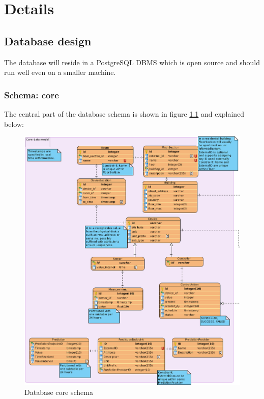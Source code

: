 
\chapter{Details}\label{ch:details}


\section{Database design}
The database will reside in a PostgreSQL DBMS which is open source and should run well even on a smaller machine.

\subsection{Schema: core}
The central part of the database schema is shown in figure \ref{figureDbCoreModel} and explained below:

\begin{figure}[H]
    \centering
    \includegraphics[width=\textwidth]{figures/db_core_schema}
    \caption{Database core schema}
    \label{figureDbCoreModel}
\end{figure}


